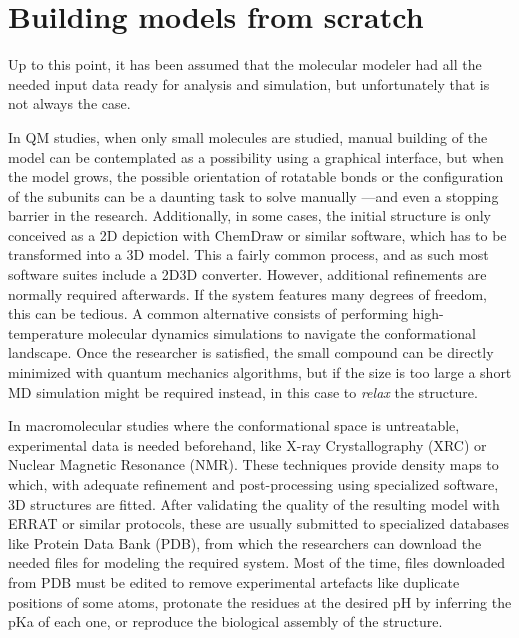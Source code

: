 \section{Building models from scratch}
\label{section:buildingmodels}
Up to this point, it has been assumed that the molecular modeler had all the needed input data ready for analysis and simulation, but unfortunately that is not always the case.

In QM studies, when only small molecules are studied, manual building of the model can be contemplated as a possibility using a graphical interface,\cite{gaussview,avogadro} but when the model grows, the possible orientation of rotatable bonds or the configuration of the subunits can be a daunting task to solve manually ---and even a stopping barrier in the research. Additionally, in some cases, the initial structure is only conceived as a 2D depiction with ChemDraw\cite{chemdraw} or similar software, which has to be transformed into a 3D model. This a fairly common process, and as such most software suites include a 2D\textrightarrow 3D converter. However, additional refinements are normally required afterwards. If the system features many degrees of freedom, this can be tedious. A common alternative consists of performing high-temperature molecular dynamics simulations to navigate the conformational landscape. Once the researcher is satisfied, the small compound can be directly minimized with quantum mechanics algorithms, but if the size is too large a short MD simulation might be required instead, in this case to \textit{relax} the structure.

In macromolecular studies where the conformational space is untreatable, experimental data is needed beforehand, like X-ray Crystallography (XRC) or Nuclear Magnetic Resonance (NMR). These techniques provide density maps to which, with adequate refinement and post-processing using specialized software,\cite{ccp4,phenix} 3D structures are fitted. After validating the quality of the resulting model with ERRAT\cite{errat} or similar protocols, these are usually submitted to specialized databases like Protein Data Bank (PDB),\cite{proteindatabank} from which the researchers can download the needed files for modeling the required system. Most of the time, files downloaded from PDB must be edited to remove experimental artefacts like duplicate positions of some atoms, protonate the residues at the desired pH by inferring the pKa of each one,\cite{word1999asparagine,propka,addh} or reproduce the biological assembly of the structure.\cite{bietz2016siena,sym}

